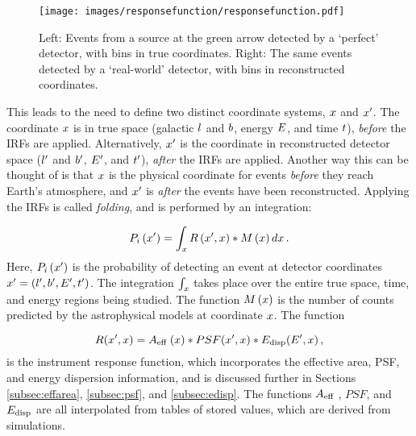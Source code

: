   \begin{figure}[!t]
    \centering
    \texttt{[image: images/responsefunction/responsefunction.pdf]}
    \caption[Response Function Dispersion]
    {
      Left: Events from a source at the green arrow detected by a `perfect' detector, with bins in true coordinates.
      Right: The same events detected by a `real-world' detector, with bins in reconstructed coordinates.
    }
    \label{fig:responsedispersion}
  \end{figure}
  
  This leads to the need to define two distinct coordinate systems, $x$ and $x'$.
  The coordinate $x$ is in true space (galactic $l$ and $b$, energy $E$, and time $t$), \textit{before} the IRFs are applied.
  Alternatively, $x'$ is the coordinate in reconstructed detector space ($l'$ and $b'$, $E'$, and $t'$), \textit{after} the IRFs are applied.
  Another way this can be thought of is that $x$ is the physical coordinate for events \textit{before} they reach Earth's atmosphere, and $x'$ is \textit{after} the events have been reconstructed.
  Applying the IRFs is called \textit{folding}, and is performed by an integration:
  
  \begin{equation}\label{eqn:folding}
    P_i \left( x' \right ) = \int_x R \left ( x', x \right ) * M \left ( x \right ) dx \,.
  \end{equation}
  Here, $P_i \left( x' \right )$ is the probability of detecting an event at detector coordinates $x' = \left ( l', b', E', t' \right )$.
  The integration $\int_x$ takes place over the entire true space, time, and energy regions being studied.
  The function $M\left ( x \right )$ is the number of counts predicted by the astrophysical models at coordinate $x$. %
  The function
  
  \begin{equation}\label{eqn:foldingR}
    R(x',x) = A_\textrm{eff }(x) * PSF(x',x) * E_\textrm{disp}(E',x) \,,
  \end{equation}
  is the instrument response function, which incorporates the effective area, PSF, and energy dispersion information, and is discussed further in Sections \ref{subsec:effarea}, \ref{subsec:psf}, and \ref{subsec:edisp}.
  The functions $A_\textrm{eff }$, $PSF$, and $E_\textrm{disp}$ are all interpolated from tables of stored values, which are derived from simulations.

